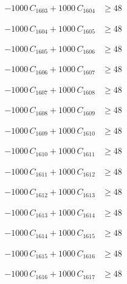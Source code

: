 \documentclass[a4paper,11pt]{article}
\begin{document}
\begin{align}
-1000\,C_{1603} + 1000\,C_{1604} &\geq 48 \nonumber
\end{align}

\begin{align}
-1000\,C_{1604} + 1000\,C_{1605} &\geq 48 \nonumber
\end{align}

\begin{align}
-1000\,C_{1605} + 1000\,C_{1606} &\geq 48 \nonumber
\end{align}

\begin{align}
-1000\,C_{1606} + 1000\,C_{1607} &\geq 48 \nonumber
\end{align}

\begin{align}
-1000\,C_{1607} + 1000\,C_{1608} &\geq 48 \nonumber
\end{align}

\begin{align}
-1000\,C_{1608} + 1000\,C_{1609} &\geq 48 \nonumber
\end{align}

\begin{align}
-1000\,C_{1609} + 1000\,C_{1610} &\geq 48 \nonumber
\end{align}

\begin{align}
-1000\,C_{1610} + 1000\,C_{1611} &\geq 48 \nonumber
\end{align}

\begin{align}
-1000\,C_{1611} + 1000\,C_{1612} &\geq 48 \nonumber
\end{align}

\begin{align}
-1000\,C_{1612} + 1000\,C_{1613} &\geq 48 \nonumber
\end{align}

\begin{align}
-1000\,C_{1613} + 1000\,C_{1614} &\geq 48 \nonumber
\end{align}

\begin{align}
-1000\,C_{1614} + 1000\,C_{1615} &\geq 48 \nonumber
\end{align}

\begin{align}
-1000\,C_{1615} + 1000\,C_{1616} &\geq 48 \nonumber
\end{align}

\begin{align}
-1000\,C_{1616} + 1000\,C_{1617} &\geq 48 \nonumber
\end{align}
\end{document}
